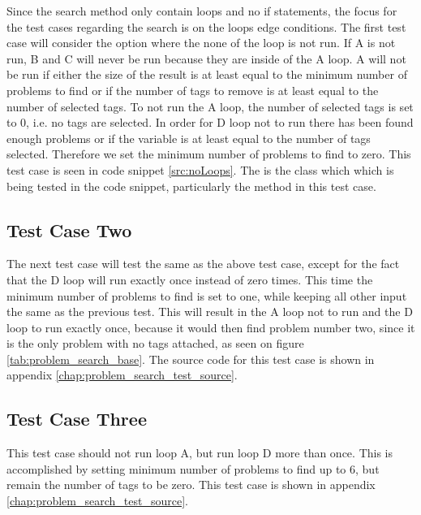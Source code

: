 Since the search method only contain loops and no if statements, the focus for the test cases regarding the search is on the loops edge conditions.
The first test case will consider the option where the none of the loop is not run.
If A is not run, B and C will never be run because they are inside of the A loop.
A will not be run if either the size of the result is at least equal to the minimum number of problems to find or if the number of tags to remove is at least equal to the number of selected tags.
To not run the A loop, the number of selected tags is set to 0, i.e. no tags are selected.
In order for D loop not to run there has been found enough problems or if the  variable is at least equal to the number of tags selected. Therefore we set the minimum number of problems to find to zero.
This test case is seen in code snippet \ref{src:noLoops}.
The  is the class which which is being tested in the code snippet, particularly the  method in this test case.

\subsection{Test Case Two}
The next test case will test the same as the above test case, except for the fact that the D loop will run exactly once instead of zero times.
This time the minimum number of problems to find is set to one, while keeping all other input the same as the previous test.
This will result in the A loop not to run and the D loop to run exactly once, because it would then find problem number two, since it is the only problem with no tags attached, as seen on figure \ref{tab:problem_search_base}.
The source code for this test case is shown in appendix \ref{chap:problem_search_test_source}.

\subsection{Test Case Three}
This test case should not run loop A, but run loop D more than once.
This is accomplished by setting minimum number of problems to find up to 6, but remain the number of tags to be zero.
This test case is shown in appendix \ref{chap:problem_search_test_source}.

